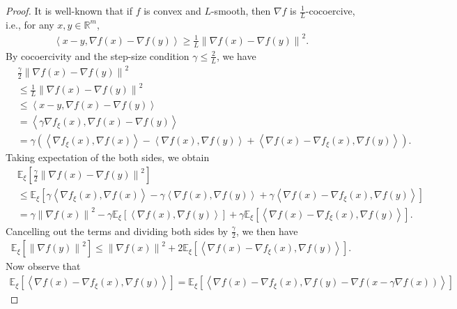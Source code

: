\documentclass[10pt,a4paper]{amsart}
\newcommand{\inprod}[2]{\left\langle #1,#2 \right\rangle}
\newcommand{\reals}{\mathbb{R}}
\newcommand{\sqnorm}[1]{\left\| #1 \right\|^2}
\begin{document}
\begin{proof}

It is well-known that if $f$ is convex and $L$-smooth, then $\nabla f$ is $\frac{1}{L}$-cocoercive, i.e., for any $x,y \in \reals^m$,
\begin{align*}
    \inprod{x-y}{\nabla f(x)-\nabla f(y)} \ge \frac{1}{L} \sqnorm{\nabla f(x) - \nabla f(y)} .
\end{align*}
By cocoercivity and the step-size condition $\gamma \le \frac{2}{L}$, we have
\begin{align*}
    & \frac{\gamma}{2} \sqnorm{\nabla f(x) - \nabla f(y)} \\
    & \le \frac{1}{L} \sqnorm{\nabla f(x) - \nabla f(y)} \\
    & \le \inprod{x-y}{\nabla f(x)-\nabla f(y)} \\
    & = \inprod{\gamma\nabla f_\xi(x)}{\nabla f(x) - \nabla f(y)} \\
    & = \gamma \left( \inprod{\nabla f_\xi(x)}{\nabla f(x)} - \inprod{\nabla f(x)}{\nabla f(y)} + \inprod{\nabla f(x) - \nabla f_\xi(x)}{\nabla f(y)} \right) .
\end{align*}
Taking expectation of the both sides, we obtain
\begin{align*}
    & \mathbb{E}_\xi \left[ \frac{\gamma}{2} \sqnorm{\nabla f(x) - \nabla f(y)} \right] \\
    & \le \mathbb{E}_\xi \left[ \gamma \inprod{\nabla f_\xi(x)}{\nabla f(x)} - \gamma \inprod{\nabla f(x)}{\nabla f(y)} + \gamma \inprod{\nabla f(x) - \nabla f_\xi(x)}{\nabla f(y)} \right] \\
    & = \gamma \sqnorm{\nabla f(x)} - \gamma \mathbb{E}_\xi \left[ \inprod{\nabla f(x)}{\nabla f(y)} \right] + \gamma \mathbb{E}_\xi \left[ \inprod{\nabla f(x) - \nabla f_\xi(x)}{\nabla f(y)} \right] .
\end{align*}
Cancelling out the terms and dividing both sides by $\frac{\gamma}{2}$, we then have
\begin{align}
\label{eqn:stochastic-descent-lemma-key-equation}
    \mathbb{E}_\xi \left[ \sqnorm{\nabla f(y)} \right] \le \sqnorm{\nabla f(x)} + 2 \mathbb{E}_\xi \left[ \inprod{\nabla f(x) - \nabla f_\xi(x)}{\nabla f(y)} \right] .
\end{align}
Now observe that 
\begin{align*}
    \mathbb{E}_\xi \left[ \inprod{\nabla f(x) - \nabla f_\xi(x)}{\nabla f(y)} \right] = \mathbb{E}_\xi \left[ \inprod{\nabla f(x) - \nabla f_\xi(x)}{\nabla f(y) - \nabla f(x - \gamma\nabla f(x))} \right]
\end{align*}

\end{proof}
\end{document}
